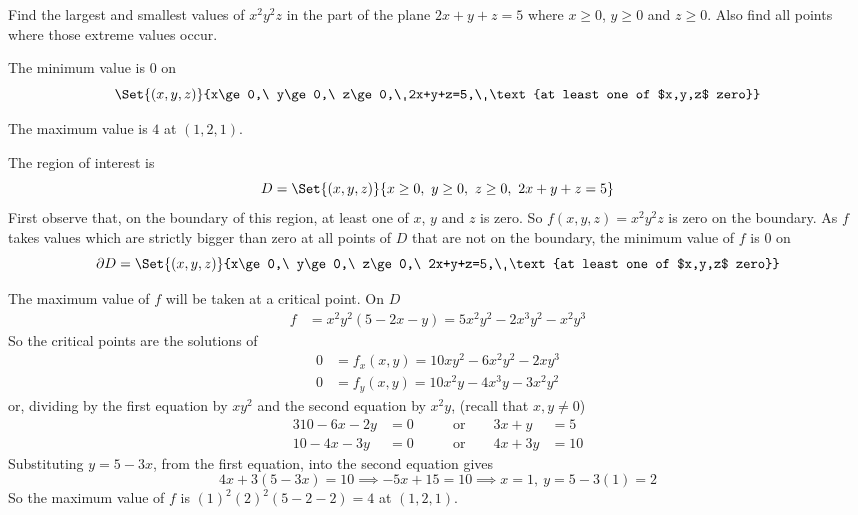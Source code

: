 \begin{question}[M200 2007A] %
Find the largest and smallest values of $x^2 y^2 z$ in the part of the 
plane $2x + y + z = 5$ where $x \ge 0$, $y \ge 0$ and $z \ge 0$. 
Also find all points where those extreme values occur.
\end{question}

%

\begin{answer}
The minimum value is $0$ on
\begin{equation*}
 \Set{(x,y,z)}{x\ge 0,\ y\ge 0,\ z\ge 0,\ 2x+y+z=5,\ 
               \text{at least one of $x,y,z$ zero}}
\end{equation*}

The maximum value is $4$ at $(1,2,1)$.
\end{answer}

\begin{solution}
The region of interest is
\begin{equation*}
D=\Set{(x,y,z)}{x\ge 0,\ y\ge 0,\ z\ge 0,\ 2x+y+z=5}
\end{equation*}
First observe that, on the boundary of this region, at least one of 
$x$, $y$ and $z$ is zero. So $f(x,y,z)=x^2 y^2 z$ is zero on the boundary.
As $f$ takes values which are strictly bigger than zero at all points of $D$
that are not on the boundary, the minimum value of $f$ is $0$ on
\begin{equation*}
\partial D = \Set{(x,y,z)}{x\ge 0,\ y\ge 0,\ z\ge 0,\ 2x+y+z=5,\ 
               \text{at least one of $x,y,z$ zero}}
\end{equation*}

The maximum value of $f$ will be taken at a critical point. 
On $D$
\begin{align*}
  f &= x^2 y^2 (5-2x-y) =5x^2 y^2 - 2x^3 y^2 -x^2 y^3
\end{align*}
So the critical points are the solutions of
\begin{align*}
0&=f_x(x,y) = 10xy^2 -6x^2y^2 -2xy^3 \\
0&=f_y(x,y) = 10x^2y -4x^3y   -3x^2y^2
\end{align*}
or, dividing by the first equation by $xy^2$ and the second equation 
by $x^2y$, (recall that $x,y\ne 0$) 
\begin{alignat*}{3}
10 -6x -2y   &=0 &\qquad\text{or}\qquad 3x+y&=5 \\
10 -4x   -3y &=0 &\qquad\text{or}\qquad 4x+3y&=10
\end{alignat*}
Substituting $y=5-3x$, from the first equation, into the second equation
gives
\begin{equation*}
4x+3(5-3x)=10
\implies -5x +15 =10
\implies x=1,\ y=5-3(1)=2
\end{equation*}
So the maximum value of $f$ is $(1)^2(2)^2(5-2-2)=4$ at $(1,2,1)$.
\end{solution}

